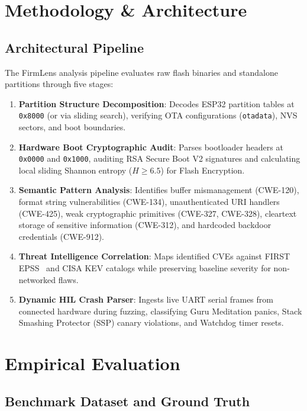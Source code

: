 \documentclass[conference]{IEEEtran}
\begin{document}
\section{Methodology \& Architecture}

\subsection{Architectural Pipeline}

The FirmLens analysis pipeline evaluates raw flash binaries and standalone partitions through five stages:

\begin{enumerate}
    \item \textbf{Partition Structure Decomposition}: Decodes ESP32 partition tables at \texttt{0x8000} (or via sliding search), verifying OTA configurations (\texttt{otadata}), NVS sectors, and boot boundaries.

    \item \textbf{Hardware Boot Cryptographic Audit}: Parses bootloader headers at \texttt{0x0000} and \texttt{0x1000}, auditing RSA Secure Boot V2 signatures and calculating local sliding Shannon entropy ($H \ge 6.5$) for Flash Encryption.

    \item \textbf{Semantic Pattern Analysis}: Identifies buffer mismanagement (CWE-120), format string vulnerabilities (CWE-134), unauthenticated URI handlers (CWE-425), weak cryptographic primitives (CWE-327, CWE-328), cleartext storage of sensitive information (CWE-312), and hardcoded backdoor credentials (CWE-912).

    \item \textbf{Threat Intelligence Correlation}: Maps identified CVEs against FIRST EPSS~\cite{epss2023} and CISA KEV catalogs while preserving baseline severity for non-networked flaws.

    \item \textbf{Dynamic HIL Crash Parser}: Ingests live UART serial frames from connected hardware during fuzzing, classifying Guru Meditation panics, Stack Smashing Protector (SSP) canary violations, and Watchdog timer resets.
\end{enumerate}

\section{Empirical Evaluation}

\subsection{Benchmark Dataset and Ground Truth}
\end{document}

